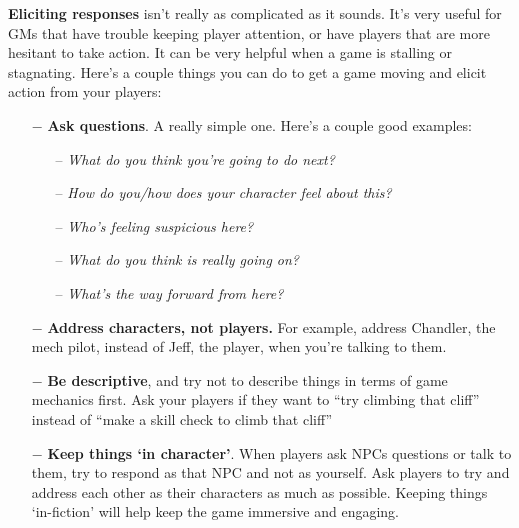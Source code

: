 \textbf{Eliciting responses} isn't really as complicated as it sounds. It's very useful for GMs that have
trouble keeping player attention, or have players that are more hesitant to take action. It can be
very helpful when a game is stalling or stagnating. Here's a couple things you can do to get a
game moving and elicit action from your players:
\begin{itemize}
    \item[$-$]\textbf{Ask questions}. A really simple one. Here's a couple good examples:
    \begin{itemize}
        \item[--]\textit{What do you think you're going to do next?}
        \item[--]\textit{How do you/how does your character feel about this?}
        \item[--]\textit{Who's feeling suspicious here?}
        \item[--]\textit{What do you think is really going on?}
        \item[--]\textit{What's the way forward from here?}
    \end{itemize}
    \item[$-$]\textbf{Address characters, not players.} For example, address Chandler, the mech
            pilot, instead of Jeff, the player, when you're talking to them.
    \item[$-$]\textbf{Be descriptive}, and try not to describe things in terms of game mechanics first.
        Ask your players if they want to ``try climbing that cliff'' instead of ``make a skill
        check to climb that cliff''
    \item[$-$]\textbf{ Keep things `in character'}. When players ask NPCs questions or talk to them, try
        to respond as that NPC and not as yourself. Ask players to try and address each
        other as their characters as much as possible. Keeping things `in-fiction' will help
        keep the game immersive and engaging.
\end{itemize}
